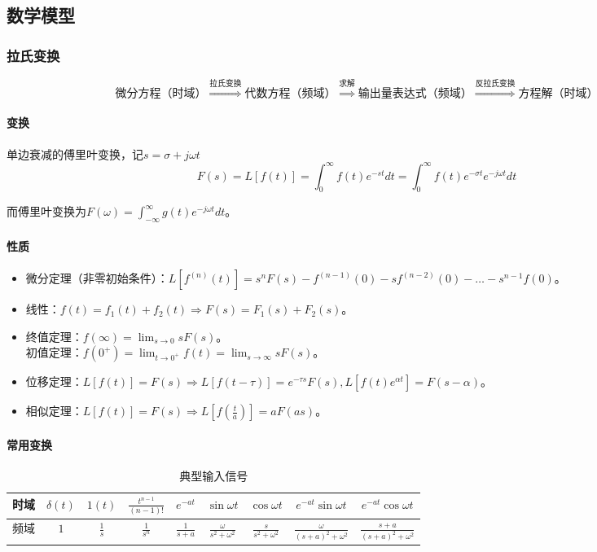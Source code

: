 \documentclass[
12pt, %
a4paper, 
oneside, %
headinclude,footinclude, %
]{scrartcl}
\begin{document}
\subsection[数学模型]{数学模型}
\subsubsection[拉氏变换]{拉氏变换}
$$ \text{微分方程（时域）}\overset{\text{拉氏变换}}{\Longrightarrow} \text{代数方程（频域）} \overset{\text{求解}}{\Longrightarrow} \text{输出量表达式（频域）} \overset{\text{反拉氏变换}}{\Longrightarrow} \text{方程解（时域）} $$
\paragraph{变换}
单边衰减的傅里叶变换，记$ s = \sigma + j \omega t $
$$ F(s) = L[f(t)] = \int_0^{\infty} f(t) e^{-st} dt = \int_0^{\infty} f(t) e^{-\sigma t} e^{-j \omega t} dt $$

而傅里叶变换为$ F(\omega) = \int_{-\infty}^{\infty} g(t) e^{-j \omega t} dt $。
\paragraph{性质}
\begin{itemize}
\item 微分定理（非零初始条件）：$ L[f^{(n)}(t)] = s^n F(s) - f^{(n - 1)}(0) - s f^{(n - 2)}(0) - \dots - s^{n - 1} f(0) $。
\item 线性：$ f(t) = f_1(t) + f_2(t) \Rightarrow F(s) = F_1(s) + F_2(s) $。
\item 终值定理：$ f(\infty) = \lim_{s \to 0} sF(s) $。\\
初值定理：$ f(0^+) = \lim_{t \to 0^+} f(t)  = \lim_{s \to \infty} sF(s) $。
\item 位移定理：$ L[f(t)] = F(s) \Rightarrow L[f(t - \tau)] = e^{-\tau s}F(s), L[f(t)e^{\alpha t}] = F(s - \alpha) $。
\item 相似定理：$ L[f(t)] = F(s) \Rightarrow L[f(\frac{t}{a})] = aF(as) $。
\end{itemize}
\paragraph{常用变换}
\begin{table}[H]
\centering
\begin{tabular}{|c|c|c|c|c|c|c|c|c|}
\hline
时域 & $ \delta(t) $ & $ 1(t) $ & $ \frac{t^{n - 1}}{(n - 1)!} $ & $ e^{-at} $ & $ \sin \omega t $ & $ \cos \omega t $ & $ e^{-at} \sin \omega t $ & $ e^{-at} \cos \omega t $ \\
\hline
频域 & $ 1 $ & $ \frac{1}{s} $ & $ \frac{1}{s^n} $ & $ \frac{1}{s + a} $ & $ \frac{\omega}{s^2 + \omega^2} $ & $ \frac{s}{s^2 + \omega^2} $ & $ \frac{\omega}{(s + a)^2 + \omega^2} $ & $ \frac{s + a}{(s + a)^2 + \omega^2} $ \\
\hline
\end{tabular}
\caption{典型输入信号}
\end{table}
\end{document}
